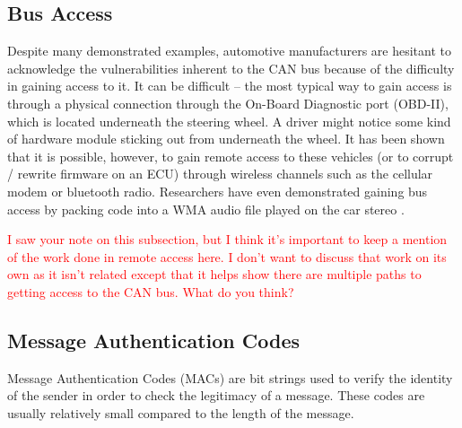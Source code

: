 \subsection{Bus Access}

Despite many demonstrated examples, automotive manufacturers are hesitant to acknowledge the vulnerabilities inherent to the CAN bus because of the difficulty in gaining access to it. It can be difficult -- the most typical way to gain access is through a physical connection through the On-Board Diagnostic port (OBD-II), which is located underneath the steering wheel. A driver might notice some kind of hardware module sticking out from underneath the wheel. It has been shown that it is possible, however, to gain remote access to these vehicles (or to corrupt / rewrite firmware on an ECU) through wireless channels such as the cellular modem or bluetooth radio. Researchers have even demonstrated gaining bus access by packing code into a WMA audio file played on the car stereo \cite{Checkoway-2011}.

\textcolor{red}{I saw your note on this subsection, but I think it's important to keep a mention of the work done in remote access here. I don't want to discuss that work on its own as it isn't related except that it helps show there are multiple paths to getting access to the CAN bus. What do you think?}

\subsection{Message Authentication Codes}

Message Authentication Codes (MACs) are bit strings used to verify the identity of the sender in order to check the legitimacy of a message. These codes are usually relatively small compared to the length of the message. 


